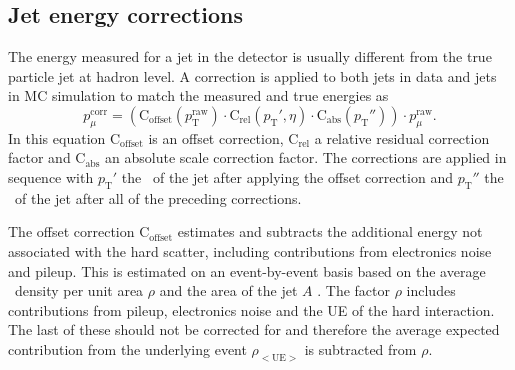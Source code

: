 \subsection{Jet energy corrections}
\label{sec:objects_jets_jec}
The energy measured for a jet in the detector is usually different from 
the true particle jet at hadron level. A correction \cite{cms-jec-2011} is applied to both
jets in data and jets in \ac{MC} simulation to match the measured and true
energies as
\begin{equation}\label{eqn:objects_jec}
p_{\mu}^{\text{corr}} = 
 (\text{C}_{\text{offset}}(p_{\text{T}}^{\text{raw}})\cdot
\text{C}_{\text{rel}}(p_{\text{T}}',\eta)
\cdot \text{C}_{\text{abs}}(p_{\text{T}}''))\cdot p_{\mu}^{\text{raw}}.
\end{equation}
In this equation $\text{C}_{\text{offset}}$ is an offset correction,
$\text{C}_{\text{rel}}$ a relative residual correction
factor and $\text{C}_{\text{abs}}$ an absolute scale correction factor. The corrections
are applied in sequence with $p_{\text{T}}'$ the \pT~of the jet after applying the offset correction and $p_{\text{T}}''$ the \pT~of the
jet after all of the preceding corrections.

The offset correction $\text{C}_{\text{offset}}$ estimates and subtracts the additional energy
not associated with the hard scatter,
including contributions from electronics noise and pileup. This is
estimated on an event-by-event basis based on the average \pT~density
per unit area $\rho$ and the area of the jet $A$ \cite{jet-area}. The factor $\rho$ includes
contributions from pileup, electronics noise and the \ac{UE} of the hard interaction. The 
last of these should not be corrected for and therefore the average expected contribution
from the underlying event $\rho_{<\text{UE}>}$ is subtracted from $\rho$.

